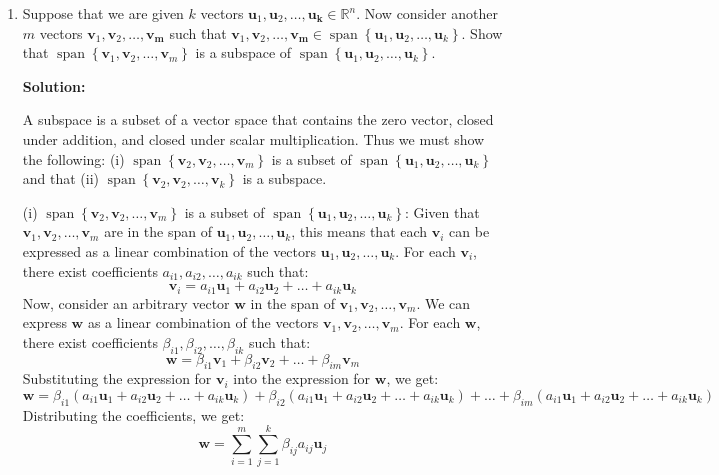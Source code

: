 \begin{enumerate}[label=(\alph*)]
	\item Suppose that we are given $k$ vectors $\mathbf{u}_1, \mathbf{u}_2,
		      \ldots, \mathbf{u}_{\mathbf{k}} \in \mathbb{R}^n$. Now consider another
	      $m$ vectors $\mathbf{v}_1, \mathbf{v}_2, \ldots,
		      \mathbf{v}_{\mathbf{m}}$ such that
	      $\mathbf{v}_1, \mathbf{v}_2, \ldots, \mathbf{v}_{\mathbf{m}}
		      \in \operatorname{span}\left\{\mathbf{u}_{1}, \mathbf{u}_{2}, \ldots,
		      \mathbf{u}_{k}\right\}$. Show that $\operatorname{span}\left\{\mathbf{v}_{1},
		      \mathbf{v}_{2}, \ldots, \mathbf{v}_{m}\right\}$ is a subspace of
	      $\operatorname{span}\left\{\mathbf{u}_{1}, \mathbf{u}_{2}, \ldots,
		      \mathbf{u}_{k}\right\}$.


	      \par \textbf{Solution:}
	      \par A subspace is a subset of a vector space that contains the zero
	      vector, closed under addition, and closed under scalar multiplication.
	      Thus we must show the following: (i) $\operatorname{span}\left\{\mathbf{v}_{2},
		      \mathbf{v}_{2}, \ldots, \mathbf{v}_{m}\right\}$ is a subset of
	      $\operatorname{span}\left\{\mathbf{u}_{1}, \mathbf{u}_{2}, \ldots,
		      \mathbf{u}_{k}\right\}$ and that (ii) $\operatorname{span}\left\{\mathbf{v}_{2},
		      \mathbf{v}_{2}, \ldots, \mathbf{v}_{k}\right\}$ is a subspace.

	      \par (i) $\operatorname{span}\left\{\mathbf{v}_{2},
		      \mathbf{v}_{2}, \ldots, \mathbf{v}_{m}\right\}$ is a subset of
	      $\operatorname{span}\left\{\mathbf{u}_{1}, \mathbf{u}_{2}, \ldots,
		      \mathbf{u}_{k}\right\}$: Given that $\mathbf{v}_1, \mathbf{v}_2,
		      \ldots, \mathbf{v}_m$ are in the span of $\mathbf{u}_1, \mathbf{u}_2,
		      \ldots, \mathbf{u}_k$, this means that each $\mathbf{v}_i$ can be
	      expressed as a linear combination of the vectors $\mathbf{u}_1,
		      \mathbf{u}_2, \ldots, \mathbf{u}_k$. For each
	      $\mathbf{v}_i$, there exist coefficients $a_{i1}, a_{i2}, \ldots,
		      a_{ik}$ such that:
	      $$ \mathbf{v}_i = a_{i1}\mathbf{u}_1 + a_{i2}\mathbf{u}_2 + \ldots + a_{ik}\mathbf{u}_k $$
	      Now, consider an arbitrary vector $\mathbf{w}$ in the span of
	      $\mathbf{v}_1, \mathbf{v}_2, \ldots, \mathbf{v}_m$. We can express
	      $\mathbf{w}$ as a linear combination of the vectors $\mathbf{v}_1,
		      \mathbf{v}_2, \ldots, \mathbf{v}_m$. For each
	      $\mathbf{w}$, there exist coefficients $\beta_{i1}, \beta_{i2}, \ldots,
		      \beta_{ik}$ such that:
	      $$ \mathbf{w} = \beta_{i1}\mathbf{v}_1 + \beta_{i2}\mathbf{v}_2 + \ldots + \beta_{im}\mathbf{v}_m $$
	      Substituting the expression for $\mathbf{v}_i$ into the expression for $\mathbf{w}$, we get:
	      $$ \mathbf{w} = \beta_{i1}(a_{i1}\mathbf{u}_1 + a_{i2}\mathbf{u}_2 + \ldots + a_{ik}\mathbf{u}_k) + \beta_{i2}(a_{i1}\mathbf{u}_1 + a_{i2}\mathbf{u}_2 + \ldots + a_{ik}\mathbf{u}_k) + \ldots + \beta_{im}(a_{i1}\mathbf{u}_1 + a_{i2}\mathbf{u}_2 + \ldots + a_{ik}\mathbf{u}_k) $$
	      Distributing the coefficients, we get:
	      $$ \mathbf{w} = \sum_{i=1}^{m} \sum_{j=1}^{k} \beta_{ij}a_{ij}\mathbf{u}_j $$


\end{enumerate}
